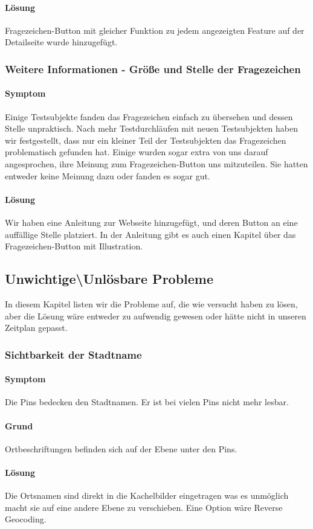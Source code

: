 \paragraph{Lösung}
Fragezeichen-Button mit gleicher Funktion zu jedem angezeigten Feature auf der Detailseite wurde hinzugefügt.

\subsubsection{Weitere Informationen - Größe und Stelle der Fragezeichen}

\paragraph{Symptom}
Einige Testsubjekte fanden das Fragezeichen einfach zu übersehen und dessen Stelle unpraktisch. Nach mehr Testdurchläufen mit neuen Testsubjekten haben wir festgestellt, dass nur ein kleiner Teil der Testsubjekten das Fragezeichen problematisch gefunden hat. Einige wurden sogar extra von uns darauf angesprochen, ihre Meinung zum Fragezeichen-Button uns mitzuteilen. Sie hatten entweder keine Meinung dazu oder fanden es sogar gut.

\paragraph{Lösung}
Wir haben eine Anleitung zur Webseite hinzugefügt, und deren Button an eine auffällige Stelle platziert. In der Anleitung gibt es auch einen Kapitel über das Fragezeichen-Button mit Illustration. 


\subsection{Unwichtige\textbackslash Unlösbare Probleme}

In diesem Kapitel listen wir die Probleme auf, die wie versucht haben zu lösen, aber die Lösung wäre entweder zu aufwendig gewesen oder hätte nicht in unseren Zeitplan gepasst.


\subsubsection{Sichtbarkeit der Stadtname}
\paragraph{Symptom}
Die Pins bedecken den Stadtnamen. Er ist bei vielen Pins nicht mehr lesbar.

\paragraph{Grund}
Ortbeschriftungen befinden sich auf der Ebene unter den Pins. 

\paragraph{Lösung}
Die Ortsnamen sind direkt in die Kachelbilder eingetragen was es unmöglich macht sie 
auf eine andere Ebene zu verschieben. Eine Option wäre Reverse Geocoding.

